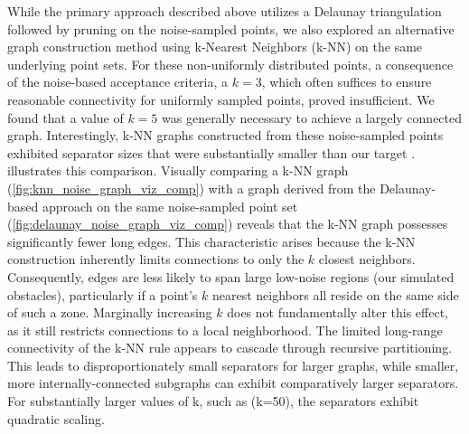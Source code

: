 While the primary approach described above utilizes a Delaunay triangulation followed by pruning on the noise-sampled points, we also explored an alternative graph construction method using k-Nearest Neighbors (k-NN) on the same underlying point sets.
For these non-uniformly distributed points, a consequence of the noise-based acceptance criteria, a \(k=3\), which often suffices to ensure reasonable connectivity for uniformly sampled points, proved insufficient.
We found that a value of \(k=5\) was generally necessary to achieve a largely connected graph.
Interestingly, k-NN graphs constructed from these noise-sampled points exhibited separator sizes that were substantially smaller than our target .
 illustrates this comparison.
Visually comparing a k-NN graph (\cref{fig:knn_noise_graph_viz_comp}) with a graph derived from the Delaunay-based approach on the same noise-sampled point set (\cref{fig:delaunay_noise_graph_viz_comp}) reveals that the k-NN graph possesses significantly fewer long edges.
This characteristic arises because the k-NN construction inherently limits connections to only the \(k\) closest neighbors.
Consequently, edges are less likely to span large low-noise regions (our simulated obstacles), particularly if a point's \(k\) nearest neighbors all reside on the same side of such a zone.
Marginally increasing \(k\) does not fundamentally alter this effect, as it still restricts connections to a local neighborhood.
The limited long-range connectivity of the k-NN rule appears to cascade through recursive partitioning. This leads to disproportionately small separators for larger graphs, while smaller, more internally-connected subgraphs can exhibit comparatively larger separators.
For substantially larger values of k, such as (k=50), the separators exhibit quadratic scaling.


